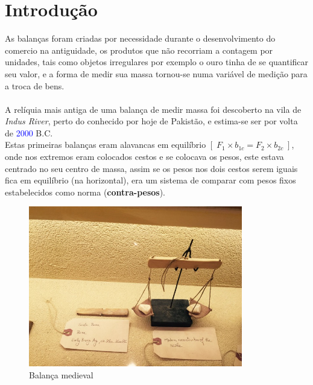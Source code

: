 \chapter{Introdução}
As balanças foram criadas por necessidade durante o desenvolvimento do comercio na antiguidade, os produtos que não recorriam a contagem por unidades, tais como objetos irregulares por exemplo o ouro tinha de se quantificar seu valor, e a forma de medir sua massa tornou-se numa variável de medição para a troca de bens.\\
\\
A relíquia mais antiga de uma balança de medir massa foi descoberto na vila de \textit{Indus River}, perto do conhecido por hoje de Pakistão, e estima-se ser por volta de \textcolor{blue}{2000} B.C.\\
Estas primeiras balanças eram alavancas em equilíbrio $[ \; F_{1} \times b_{1c} = F_{2} \times b_{2c} \; ]$, onde nos extremos eram colocados cestos e se colocava os pesos, este estava centrado no seu centro de massa, assim se os pesos nos dois cestos serem iguais fica em equilíbrio (na horizontal), era um sistema de comparar com pesos fixos estabelecidos como norma (\textbf{contra-pesos}).
\\
\begin{minipage}[!b]{0.45\linewidth}
	\begin{figure}[H]
		\centering
		\includegraphics[height=7cm]{./image/PESTA/general/balanca_1.jpg}
		\caption{Balança medieval}
		\label{balanca_1}
	\end{figure}
\end{minipage}
\hspace{2.2cm}
